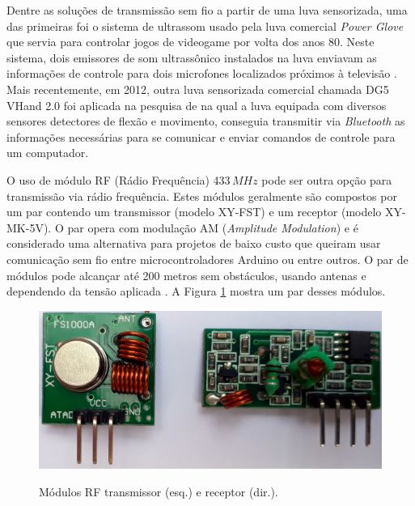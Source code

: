 \documentclass[
	12pt,				%
	openright,			%
	oneside,			%
	a4paper,			%
	english,			%
	brazil				%
	]{abntex2}
\begin{document}
		Dentre as soluções de transmissão sem fio a partir de uma luva sensorizada, uma das primeiras foi o sistema de ultrassom usado pela luva comercial \textit{Power Glove} que servia para controlar jogos de videogame por volta dos anos 80. Neste sistema, dois emissores de som ultrassônico instalados na luva enviavam as informações de controle para dois microfones localizados próximos à televisão \cite{dana1989powerglove}. Mais recentemente, em 2012, outra luva sensorizada comercial chamada DG5 VHand 2.0 foi aplicada na pesquisa de \cite{kumar2012hci} na qual a luva equipada com diversos sensores detectores de flexão e movimento, conseguia transmitir via \textit{Bluetooth} as informações necessárias para se comunicar e enviar comandos de controle para um computador.

		O uso de módulo RF (Rádio Frequência) 433$\,MHz$ pode ser outra opção para transmissão via rádio frequência. Estes módulos geralmente são compostos por um par contendo um transmissor (modelo XY-FST) e um receptor (modelo XY-MK-5V). O par opera com modulação AM (\textit{Amplitude Modulation}) e é considerado uma alternativa para projetos de baixo custo que queiram usar comunicação sem fio entre microcontroladores Arduino ou entre outros. O par de módulos pode alcançar até 200 metros sem obstáculos, usando antenas e dependendo da tensão aplicada \cite{institutodigitalrf}. A Figura \ref{Fig:tx-rx1} mostra um par desses módulos.



		\begin{figure}[h!]
			\centering
			\caption{Módulos RF transmissor (esq.) e receptor (dir.).}
  		\includegraphics[width=12cm]{./figures/tx-rx1.jpg}
  		\label{Fig:tx-rx1}
		\end{figure}
\end{document}
